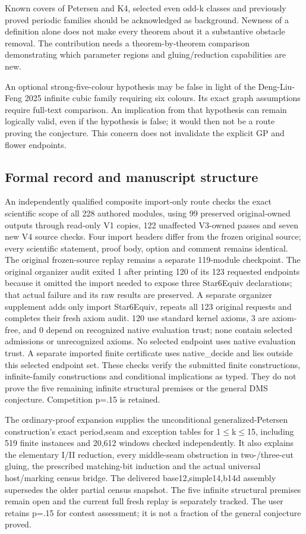 \documentclass[11pt,a4paper]{article}
\begin{document}
Known covers of Petersen and K4, selected even odd-k classes and previously proved periodic families should be acknowledged as background. Newness of a definition alone does not make every theorem about it a substantive obstacle removal. The contribution needs a theorem-by-theorem comparison demonstrating which parameter regions and gluing/reduction capabilities are new.

An optional strong-five-colour hypothesis may be false in light of the Deng-Liu-Feng 2025 infinite cubic family requiring six colours. Its exact graph assumptions require full-text comparison. An implication from that hypothesis can remain logically valid, even if the hypothesis is false; it would then not be a route proving the conjecture. This concern does not invalidate the explicit GP and flower endpoints.

\subsection{Formal record and manuscript structure}
An independently qualified composite import-only route checks the exact scientific scope of all 228 authored modules, using 99 preserved original-owned outputs through read-only V1 copies, 122 unaffected V3-owned passes and seven new V4 source checks. Four import headers differ from the frozen original source; every scientific statement, proof body, option and comment remains identical. The original frozen-source replay remains a separate 119-module checkpoint. The original organizer audit exited 1 after printing 120 of its 123 requested endpoints because it omitted the import needed to expose three Star6Equiv declarations; that actual failure and its raw results are preserved. A separate organizer supplement adds only import Star6Equiv, repeats all 123 original requests and completes their fresh axiom audit. 120 use standard kernel axioms, 3 are axiom-free, and 0 depend on recognized native evaluation trust; none contain selected admissions or unrecognized axioms. No selected endpoint uses native evaluation trust. A separate imported finite certificate uses native\_decide and lies outside this selected endpoint set. These checks verify the submitted finite constructions, infinite-family constructions and conditional implications as typed. They do not prove the five remaining infinite structural premises or the general DMS conjecture. Competition p=.15 is retained.

The ordinary-proof expansion supplies the unconditional generalized-Petersen construction's exact period,seam and exception tables for 1\ensuremath{\leq}k\ensuremath{\leq}15, including 519 finite instances and 20,612 windows checked independently. It also explains the elementary I/II reduction, every middle-seam obstruction in two-/three-cut gluing, the prescribed matching-bit induction and the actual universal host/marking census bridge. The delivered base12,simple14,b14d assembly supersedes the older partial census snapshot. The five infinite structural premises remain open and the current full fresh replay is separately tracked. The user retains p=.15 for contest assessment; it is not a fraction of the general conjecture proved.
\end{document}

